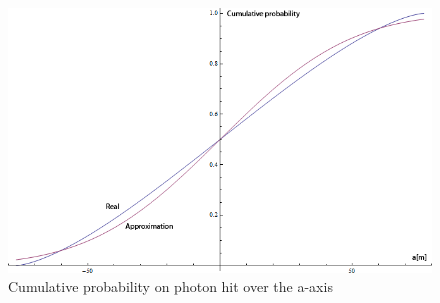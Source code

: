 \begin{figure}[ht]
	\centering
	\includegraphics[width=1\textwidth, angle = 0]{chapters/img/ellipticalArea.png}%
		\caption{Cumulative probability on photon hit over the a-axis}%
		\label{fig:CDFcomparison}
\end{figure}